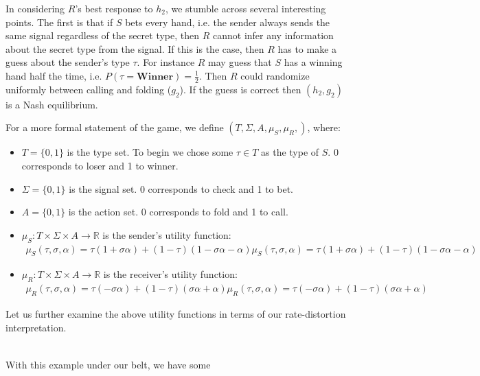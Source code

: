 \documentclass{article}
\begin{document}
In considering $R$'s best response to $h_2$, we stumble across several interesting points. The first is that if $S$ bets every hand, i.e. the sender always sends the same signal regardless of the secret type, then $R$ cannot infer any information about the secret type from the signal. If this is the case, then $R$ has to make a guess about the sender's type $\tau$. For instance $R$ may guess that $S$ has a winning hand half the time, i.e. $P(\tau = \textbf{Winner}) = \frac{1}{2}$. Then $R$ could randomize uniformly between calling and folding ($g_2$). If the guess is correct then $(h_2, g_2)$ is a Nash equilibrium.

For a more formal statement of the game, we define $\left(T, \Sigma, A, \mu_S, \mu_R, \right)$, where:
\begin{itemize}
	\item $T = \lbrace 0, 1 \rbrace$ is the type set. To begin we chose some $\tau \in T$ as the type of $S$. 0 corresponds to loser and 1 to winner.
	\item $\Sigma = \lbrace 0, 1 \rbrace$ is the signal set. 0 corresponds to check and 1 to bet.
		\item $A = \lbrace 0, 1 \rbrace$ is the action set. 0 corresponds to fold and 1 to call.
	\item $\mu_S: T \times \Sigma \times A \longrightarrow \mathbb{R}$ is the sender's utility function:
		\begin{align*}
\mu_S(\tau, \sigma, \alpha) = \tau(1+\sigma\alpha) + (1-\tau)(1-\sigma\alpha-\alpha)
\mu_S(\tau, \sigma, \alpha) = \tau(1+\sigma\alpha) + (1-\tau)(1-\sigma\alpha-\alpha)
		\end{align*}
	\item $\mu_R: T \times \Sigma \times A \longrightarrow \mathbb{R}$ is the receiver's utility function:
		\begin{align*}
\mu_R(\tau, \sigma, \alpha) = \tau(-\sigma\alpha) + (1-\tau)(\sigma\alpha+\alpha)
\mu_R(\tau, \sigma, \alpha) = \tau(-\sigma\alpha) + (1-\tau)(\sigma\alpha+\alpha)
		\end{align*}
\end{itemize}

Let us further examine the above utility functions in terms of our rate-distortion interpretation. 

\begin{align*}
\end{align*}

With this example under our belt, we have some 
\end{document}
